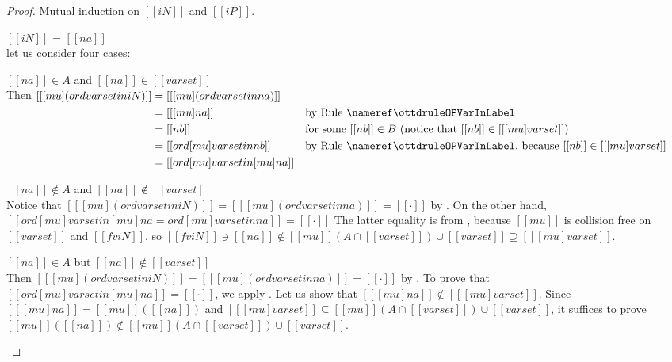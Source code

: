 \begin{proof}
  Mutual induction on $[[iN]]$ and $[[iP]]$.
  \begin{caseof}
  \item $[[iN]]$ = $[[na]]$ \label{case:distr-mu-ord:var} \\
    let us consider four cases:
    \begin{caseof}
    \item $[[na]] \in A$ and $[[na]] \in [[varset]]$\\ Then
      $
      \begin{aligned}[t] [[ [mu] (ord varset in iN) ]] &= [[ [mu] (ord varset in na)]] \\
                                                             &= [[ [mu] na ]]
                                                             && \text{by \ruleref{\ottdruleOPVarInLabel}}\\
                                                             &= [[nb]]
                                                             && \text{for some $[[nb]] \in B$ (notice that $[[nb]] \in [[ [mu]varset ]]$)} \\
                                                             &= [[ ord [mu]varset in nb ]]
                                                             && \text{by \ruleref{\ottdruleOPVarInLabel},
                                                                because $[[nb]] \in [[ [mu]varset ]]$} \\
                                                             &= [[ord [mu] varset in [mu] na ]]
       \end{aligned}
       $
     \item $[[na]] \notin A$ and $[[na]] \notin [[varset]]$\\
       Notice that
       $[[ [mu] (ord varset in iN) ]] = [[ [mu] (ord varset in na)]] = [[·]]$ by
       .
       On the other hand, $[[ ord [mu] varset in [mu] na = ord [mu] varset
       in na ]] = [[·]]$ The latter equality is from
       , because
       $[[mu]]$ is collision free on $[[varset]]$ and $[[fv iN]]$, so
       $[[fv iN]] \ni [[na]] \notin [[mu]](A \cap [[varset]]) \cup
       [[varset]] \supseteq [[ [mu] varset ]]$.
     \item $[[na]] \in A$ but $[[na]] \notin [[varset]]$\\ Then
       $[[ [mu] (ord varset in iN) ]] = [[ [mu] (ord varset in na)]] = [[·]]$
       by .
       To prove that $[[ ord [mu] varset in [mu] na ]] = [[·]]$, we apply
       . Let us show that
       $[[ [mu] na ]] \notin [[ [mu] varset ]]$.
       Since $[[ [mu] na ]] = [[mu]]([[na]])$ and
       $[[ [mu] varset ]] \subseteq [[mu]](A \cap [[varset]]) \cup [[varset]]$,
       it suffices to prove 
       $[[mu]]([[na]]) \notin [[mu]](A \cap [[varset]]) \cup [[varset]]$.


\end{caseof}
\end{caseof}
\end{proof}
